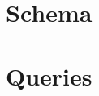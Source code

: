 \documentclass[letterpaper, 12pt]{article}
\begin{document}
\newpage
\section{Schema}

%  
%
%  


\newpage
\section{Queries}
\end{document}
